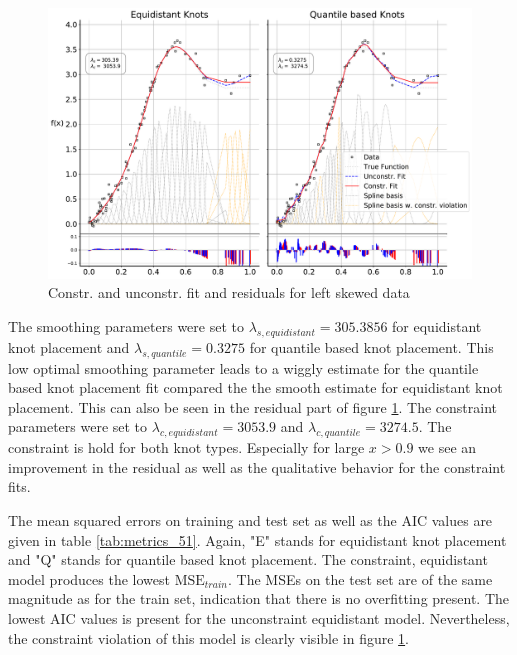 \documentclass[10pt,a4paper]{article}
\begin{document}
\begin{figure}[H]
	\centering
	\includegraphics[width=\columnwidth]{../thesisplots/exp_beta/exp_left_skewed_data_ndata_250_rseed_1.pdf}
	\caption{Constr. and unconstr. fit and residuals for left skewed data}
	\label{fig:fit_left_skew_250}
\end{figure}

The smoothing parameters were set to $\lambda_{s, equidistant} = 305.3856$ for equidistant knot placement and $\lambda_{s, quantile} = 0.3275$ for quantile based knot placement. This low optimal smoothing parameter leads to a wiggly estimate for the quantile based knot placement fit compared the the smooth estimate for equidistant knot placement. This can also be seen in the residual part of figure \ref{fig:fit_left_skew_250}. The constraint parameters were set to $\lambda_{c, equidistant} = 3053.9$ and $\lambda_{c, quantile} = 3274.5$. The constraint is hold for both knot types. Especially for large $x > 0.9$ we see an improvement in the residual as well as the qualitative behavior for the constraint fits. 

The mean squared errors on training and test set as well as the AIC values are given in table \ref{tab:metrics_51}. Again, "E" stands for equidistant knot placement and "Q" stands for quantile based knot placement. The constraint, equidistant model produces the lowest $\text{MSE}_{train}$. The MSEs on the test set are of the same magnitude as for the train set, indication that there is no overfitting present. The lowest AIC values is present for the unconstraint equidistant model. Nevertheless, the constraint violation of this model is clearly visible in figure \ref{fig:fit_left_skew_250}.
\end{document}
